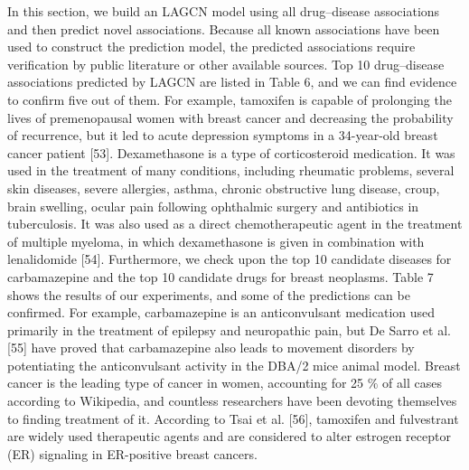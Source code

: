 \documentclass[fleqn,10pt]{wlscirep}
\begin{document}
In this section, we build an LAGCN model using all drug–disease associations and then predict novel associations. Because all known associations have been used to construct the prediction model, the predicted associations require verification by public literature or other available sources. Top 10 drug–disease associations predicted by LAGCN are listed in Table 6, and we can find evidence to confirm five out of them. For example, tamoxifen is capable of prolonging the lives of premenopausal women with breast cancer and decreasing the probability of recurrence, but it led to acute depression symptoms in a 34-year-old breast cancer patient [53]. Dexamethasone is a type of corticosteroid medication. It was used in the treatment of many conditions, including rheumatic problems, several skin diseases, severe allergies, asthma, chronic obstructive lung disease, croup, brain swelling, ocular pain following ophthalmic surgery and antibiotics in tuberculosis. It was also used as a direct chemotherapeutic agent in the treatment of multiple myeloma, in which dexamethasone is given in combination with lenalidomide [54].
Furthermore, we check upon the top 10 candidate diseases for carbamazepine and the top 10 candidate drugs for breast neoplasms. Table 7 shows the results of our experiments, and some of the predictions can be confirmed. For example, carbamazepine is an anticonvulsant medication used primarily in the treatment of epilepsy and neuropathic pain, but De Sarro et al. [55] have proved that carbamazepine also leads to movement disorders by potentiating the anticonvulsant activity in the DBA/2 mice animal model. Breast cancer is the leading type of cancer in women, accounting for 25 $\%$ of all cases according to Wikipedia, and countless researchers have been devoting themselves to finding treatment of it. According to Tsai et al. [56], tamoxifen and fulvestrant are widely used therapeutic agents and are considered to alter estrogen receptor (ER) signaling in ER-positive breast cancers.
\end{document}
